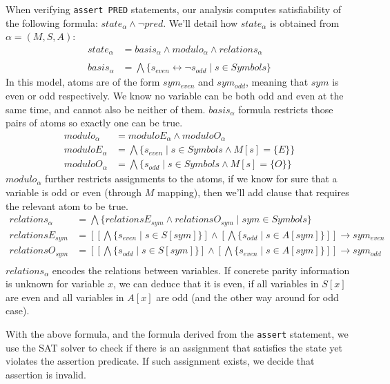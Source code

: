 When verifying \texttt{assert PRED} statements, our analysis computes satisfiability of the following formula: $state_\alpha\land\neg pred$. We'll detail how $state_\alpha$ is obtained from $\alpha = (M,S,A)$:
\begin{align*}
state_\alpha & = basis_\alpha \land modulo_\alpha \land relations_\alpha \\
\\
basis_\alpha &= \bigwedge\{s_{even}\leftrightarrow\neg s_{odd} \mid s \in Symbols\}
\end{align*}
In this model, atoms are of the form $sym_{even}$ and $sym_{odd}$, meaning that $sym$ is even or odd respectively. We know no variable can be both odd and even at the same time, and cannot also be neither of them. $basis_\alpha$ formula restricts those pairs of atoms so exactly one can be true.
\begin{align*}
modulo_\alpha &= moduloE_\alpha \land moduloO_\alpha \\
moduloE_\alpha &= \bigwedge\{s_{even} \mid s \in Symbols \land M[s] = \{E\}\} \\
moduloO_\alpha &= \bigwedge\{s_{odd} \mid s \in Symbols \land M[s] = \{O\}\}
\end{align*}
$modulo_\alpha$ further restricts assignments to the atoms, if we know for sure that a variable is odd or even (through $M$ mapping), then we'll add clause that requires the relevant atom to be true.
\begin{align*}
relations_\alpha &= \bigwedge \{relationsE_{sym} \land relationsO_{sym}  \mid sym \in Symbols\} \\
relationsE_{sym} &= \left[
	\left[
		\bigwedge \{s_{even} \mid s \in S[sym]\}
	\right] \land  \left[
		\bigwedge \{s_{odd} \mid s \in A[sym]\}
	\right]
\right]
\rightarrow sym_{even} \\
relationsO_{sym} &= \left[
	\left[
		\bigwedge \{s_{odd} \mid s \in S[sym]\}
	\right] \land  \left[
		\bigwedge \{s_{even} \mid s \in A[sym]\}
	\right]
\right]
\rightarrow sym_{odd} \\
\end{align*}
$relations_\alpha$ encodes the relations between variables. If concrete parity information is unknown for variable $x$, we can deduce that it is even, if all variables in $S[x]$ are even and all variables in $A[x]$ are odd (and the other way around for odd case).

With the above formula, and the formula derived from the \texttt{assert} statement, we use the SAT solver to check if there is an assignment that satisfies the state yet violates the assertion predicate. If such assignment exists, we decide that assertion is invalid.

